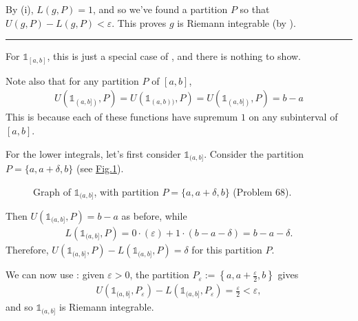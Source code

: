 \documentclass[letterpaper,10pt,english]{jupyterBook}
\let\sphinxpxdimen\pdfpxdimen\else\newdimen\sphinxpxdimen
\begin{document}
\sphinxAtStartPar
By (i), \(L(g,P)=1\), and so we’ve found a partition \(P\) so that \(U(g,P)-L(g,P)<\varepsilon\). This proves \(g\) is Riemann integrable (by ).


\bigskip\hrule\bigskip


\sphinxAtStartPar
{\hyperref[\detokenize{Problems:id68}]{}}
For \(\mathbb{1}_{[a,b]}\), this is just a special case of , and there is nothing to show.

\sphinxAtStartPar
Note also that for any partition \(P\) of \([a,b]\),
\begin{equation*}
\begin{split}
U(\mathbb{1}_{(a,b])},P) = U(\mathbb{1}_{(a,b))},P) = U(\mathbb{1}_{(a,b])},P) = b-a
\end{split}
\end{equation*}
\sphinxAtStartPar
This is because each of these functions have supremum \(1\) on any subinterval of \([a,b]\).

\sphinxAtStartPar
For the lower integrals, let’s first consider \(\mathbb{1}_{(a,b]}\). Consider the partition \(P=\{a,a+\delta,b\}\)  (see \hyperref[\detokenize{Solutions-full:q68}]{Fig.\@ \ref{\detokenize{Solutions-full:q68}}}).

\begin{figure}[htbp]
\centering
\capstart

\noindent\sphinxincludegraphics[width=500\sphinxpxdimen]{{q68}.png}
\caption{Graph  of \(\mathbb{1}_{(a,b]}\), with partition \(P=\{a,a+\delta,b\}\) (Problem 68).}\label{\detokenize{Solutions-full:q68}}\end{figure}

\sphinxAtStartPar
Then \(U(\mathbb{1}_{(a,b]},P) = b-a\) as before, while
\begin{equation*}
\begin{split}
L(\mathbb{1}_{(a,b]},P) = 0\cdot(\varepsilon) + 1\cdot(b-a-\delta) = b-a-\delta.
\end{split}
\end{equation*}
\sphinxAtStartPar
Therefore, \(U(\mathbb{1}_{(a,b]},P) -L(\mathbb{1}_{(a,b]},P) = \delta\) for this partition \(P\).

\sphinxAtStartPar
We can now use : given \(\varepsilon>0\), the partition \(P_\varepsilon:=\left\{a,a+\frac{\varepsilon}{2},b\right\}\) gives
\begin{equation*}
\begin{split}
U(\mathbb{1}_{(a,b]},P_\varepsilon) -L(\mathbb{1}_{(a,b]},P_\varepsilon) = \frac{\varepsilon}{2} < \varepsilon, 
\end{split}
\end{equation*}
\sphinxAtStartPar
and so \(\mathbb{1}_{(a,b]}\) is Riemann integrable.
\end{document}
